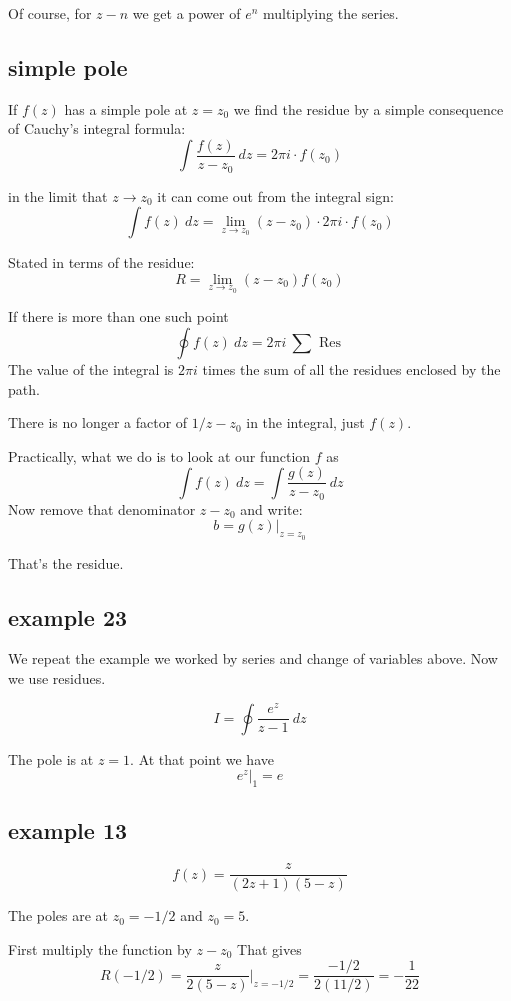 \documentclass[11pt, oneside]{article}
\begin{document}
Of course, for $z - n$ we get a power of $e^n$ multiplying the series.

\subsection*{simple pole}

If $f(z)$ has a simple pole at $z = z_0$ we find the residue by a simple consequence of Cauchy's integral formula:
\[ \int \frac{f(z)}{z - z_0} \ dz = 2 \pi i \cdot f(z_0) \]

in the limit that $z \rightarrow z_0$ it can come out from the integral sign:
\[ \int f(z) \ dz = \lim_{z \rightarrow z_0} (z - z_0) \cdot 2 \pi i \cdot f(z_0) \]

Stated in terms of the residue: 
\[ R = \lim_{z \rightarrow z_0} (z - z_0) f(z_0) \]

If there is more than one such point
\[ \oint f(z) \ dz = 2 \pi i \ \sum \text{ Res } \]
The value of the integral is $2 \pi i$ times the sum of all the residues enclosed by the path.

There is no longer a factor of $1/z-z_0$ in the integral, just $f(z)$.

Practically, what we do is to look at our function $f$ as
\[ \int f(z) \ dz = \int \frac{g(z)}{z - z_0} \ dz \]
Now remove that denominator $z - z_0$ and write:
\[ b = g(z) \bigg |_{z=z_0} \]

That's the residue.

\subsection*{example 23}

\label{sec:ex23R}

We repeat the example we worked by series and change of variables above.  Now we use residues.

\[ I = \oint \frac{e^z}{z - 1} \ dz \]

The pole is at $z = 1$.  At that point we have
\[ e^z \bigg |_1 = e \]

\subsection*{example 13}

\label{sec:ex13R}

\[ f(z) = \frac{z}{(2z + 1)(5 - z)} \]

The poles are at $z_0 = -1/2$ and $z_0 = 5$.

First multiply the function by $z - z_0$  That gives
\[  R(-1/2) = \frac{z}{2 (5 - z)} \bigg |_{z = -1/2}  = \frac{-1/2}{2(11/2)} = -\frac{1}{22} \]
\end{document}
